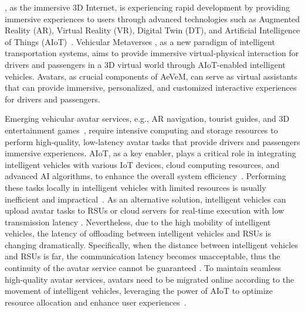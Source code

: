 \documentclass[lettersize,journal]{IEEEtran}
\begin{document}
, as the immersive 3D Internet, is experiencing rapid development by providing immersive experiences to users through advanced technologies such as Augmented Reality (AR), Virtual Reality (VR), Digital Twin (DT), and Artificial Intelligence of Things (AIoT)~\cite{han2022dynamic}. Vehicular Metaverses \cite{huang2022joint}, as a new paradigm of intelligent transportation systems, aims to provide immersive virtual-physical interaction for drivers and passengers in a 3D virtual world through AIoT-enabled intelligent vehicles. Avatars, as crucial components of AeVeM, can serve as virtual assistants that can provide immersive, personalized, and customized interactive experiences for drivers and passengers.

Emerging vehicular avatar services, e.g., AR navigation, tourist guides, and 3D entertainment games~\cite{yao2021development}, require intensive computing and storage resources to perform high-quality, low-latency avatar tasks that provide drivers and passengers immersive experiences. AIoT, as a key enabler, plays a critical role in integrating intelligent vehicles with various IoT devices, cloud computing resources, and advanced AI algorithms, to enhance the overall system efficiency~\cite{liu2020toward}. Performing these tasks locally in intelligent vehicles with limited resources is usually inefficient and impractical~\cite{jiang2021reliable,li2022internet}. As an alternative solution, intelligent vehicles can upload avatar tasks to RSUs or cloud servers for real-time execution with low transmission latency \cite{zhu2022aerial}. Nevertheless, due to the high mobility of intelligent vehicles, the latency of offloading between intelligent vehicles and RSUs is changing dramatically. Specifically, when the distance between intelligent vehicles and RSUs is far, the communication latency becomes unacceptable, thus the continuity of the avatar service cannot be guaranteed \cite{chang20226g}. To maintain seamless high-quality avatar services, avatars need to be migrated online according to the movement of intelligent vehicles, leveraging the power of AIoT to optimize resource allocation and enhance user experiences~\cite{wu2023virtual}.
\end{document}
